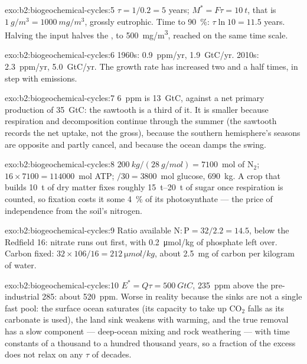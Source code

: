 \begin{solution}{exo:b2:biogeochemical-cycles:5}
$\tau = 1/0.2 = 5$ years; $M^{*} = F\tau = \qty{10}{t}$, that is
$\qty{1}{g/m^3} = \qty{1000}{mg/m^3}$, grossly eutrophic. Time to
\qty{90}{\%}: $\tau\ln 10 = 11.5$ years. Halving the input halves
the , to \qty{500}{mg/m^3}, reached on the same
time scale.
\end{solution}

\begin{solution}{exo:b2:biogeochemical-cycles:6}
1960s: \qty{0.9}{ppm/yr}, \qty{1.9}{GtC/yr}. 2010s: \qty{2.3}{ppm/yr},
\qty{5.0}{GtC/yr}. The growth rate has increased two and a half
times, in step with emissions.
\end{solution}

\begin{solution}{exo:b2:biogeochemical-cycles:7}
\qty{6}{ppm} is \qty{13}{GtC}, against a net primary production of
\qty{35}{GtC}: the sawtooth is a third of it. It is smaller because
respiration and decomposition continue through the summer (the
sawtooth records the net uptake, not the gross), because the
southern hemisphere's seasons are opposite and partly cancel, and
because the ocean damps the swing.
\end{solution}

\begin{solution}{exo:b2:biogeochemical-cycles:8}
$\qty{200}{kg}/(\qty{28}{g/mol}) = 7100$~mol of $\mathrm{N_2}$; $16\times
7100 = \num{114000}$~mol ATP; $/30 = 3800$~mol glucose, \qty{690}{kg}.
A crop that builds \qty{10}{t} of dry matter fixes roughly
\qtyrange{15}{20}{t} of sugar once respiration is counted, so
fixation costs it some \qty{4}{\%} of its photosynthate --- the
price of independence from the soil's nitrogen.
\end{solution}

\begin{solution}{exo:b2:biogeochemical-cycles:9}
Ratio available $\mathrm{N:P} = 32/2.2 = 14.5$, below the Redfield
16: nitrate runs out first, with \qty{0.2}{\micro mol/kg} of
phosphate left over. Carbon fixed: $32\times 106/16 =
\qty{212}{\micro mol/kg}$, about \qty{2.5}{mg} of carbon per
kilogram of water.
\end{solution}

\begin{solution}{exo:b2:biogeochemical-cycles:10}
$E^{*} = Q\tau = \qty{500}{GtC}$, \qty{235}{ppm} above the
pre-industrial 285: about \qty{520}{ppm}. Worse in reality because
the sinks are not a single fast pool: the surface ocean saturates
(its capacity to take up $\mathrm{CO_2}$ falls as its carbonate is used),
the land sink weakens with warming, and the true removal has a
slow component --- deep-ocean mixing and rock weathering --- with
time constants of a thousand to a hundred thousand years, so a
fraction of the excess does not relax on any $\tau$ of decades.
\end{solution}

